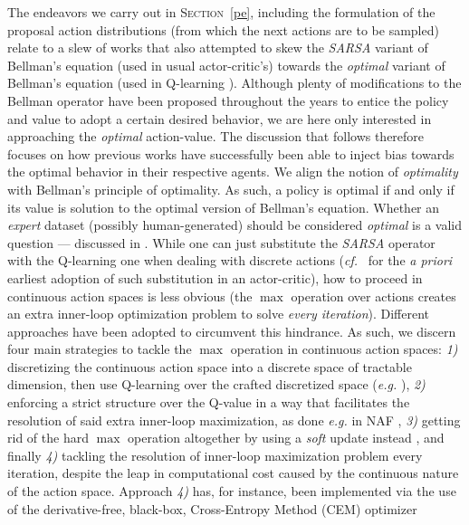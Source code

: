 The endeavors we carry out in \textsc{Section}~\ref{pe}, including the formulation of the proposal
action distributions (from which the next actions are to be sampled) relate to a slew of works that
also attempted to skew the \textit{SARSA} variant of Bellman's equation (used in usual actor-critic's)
towards the \emph{optimal} variant of Bellman's equation (used in Q-learning
\cite{Watkins1989-ir, Watkins1992-gl}).
Although plenty of modifications to the Bellman operator have been proposed throughout the years
to entice the policy and value to adopt a certain desired behavior,
we are here only interested in approaching the \emph{optimal} action-value.
The discussion that follows therefore focuses on how previous works have successfully been able to
inject bias towards the optimal behavior in their respective agents.
We align the notion of \emph{optimality} with Bellman's principle of optimality.
As such, a policy is optimal if and only if its value is solution to the optimal version of Bellman's equation.
Whether an \textit{expert} dataset (possibly human-generated) should be considered \textit{optimal} is
a valid question --- discussed in \cite{Rust1992-wa}.
While one can just substitute the \textit{SARSA} operator with the Q-learning one
when dealing with discrete actions (\textit{cf.}~\cite{Crites1995-hn}
for the \textit{a priori} earliest adoption of such substitution in an actor-critic),
how to proceed in continuous action spaces is less obvious
(the $\max$ operation over actions creates an extra inner-loop optimization problem to solve \emph{every iteration}).
Different approaches have been adopted to circumvent this hindrance.
As such, we discern four main strategies to tackle the $\max$ operation in continuous action spaces:
\textit{1)} discretizing the continuous action space
into a discrete space of tractable dimension, then use Q-learning over the crafted discretized space
(\textit{e.g.} \cite{Millan2002-sl, Kimura2007-di, Metz2017-ol}),
\textit{2)} enforcing a strict structure over the Q-value in a way that facilitates the resolution of
said extra inner-loop maximization, as done \textit{e.g.} in NAF \cite{Gu2016-zd},
\textit{3)} getting rid of the hard $\max$ operation altogether by using a \emph{soft} update
instead \cite{Haarnoja2017-wj}, and finally
\textit{4)} tackling the resolution of inner-loop maximization problem every iteration,
despite the leap in computational cost caused by the continuous nature of the action space.
Approach \textit{4)} has, for instance, been implemented via the use of the derivative-free, black-box,
Cross-Entropy Method (CEM) \cite{Rubinstein1999-qt, Mannor2003-sj} optimizer
